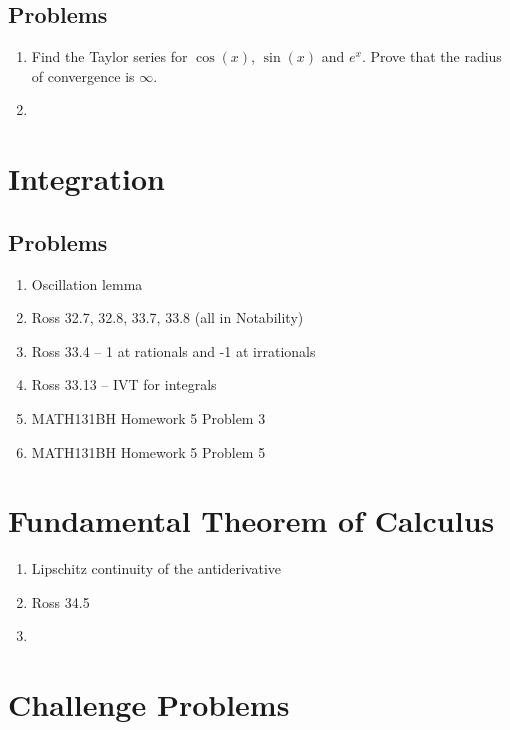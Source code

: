 \documentclass{article}
\theoremstyle{definition}
\begin{document}
\subsection{Problems}

\begin{enumerate}
    \item Find the Taylor series for $\cos(x)$, $\sin(x)$ and $e^{x}$.
    Prove that the radius of convergence is $\infty$.
    \item 
\end{enumerate}

\newpage

\section{Integration}

\subsection{Problems}

\begin{enumerate}
    \item Oscillation lemma
    \item Ross 32.7, 32.8, 33.7, 33.8 (all in Notability)
    \item Ross 33.4 -- 1 at rationals and -1 at irrationals
    \item Ross 33.13 -- IVT for integrals
    \item MATH131BH Homework 5 Problem 3
    \item MATH131BH Homework 5 Problem 5
\end{enumerate}

\newpage

\section{Fundamental Theorem of Calculus}

\begin{enumerate}
    \item Lipschitz continuity of the antiderivative
    \item Ross 34.5
    \item 
\end{enumerate}

\newpage

\section{Challenge Problems}
\end{document}
